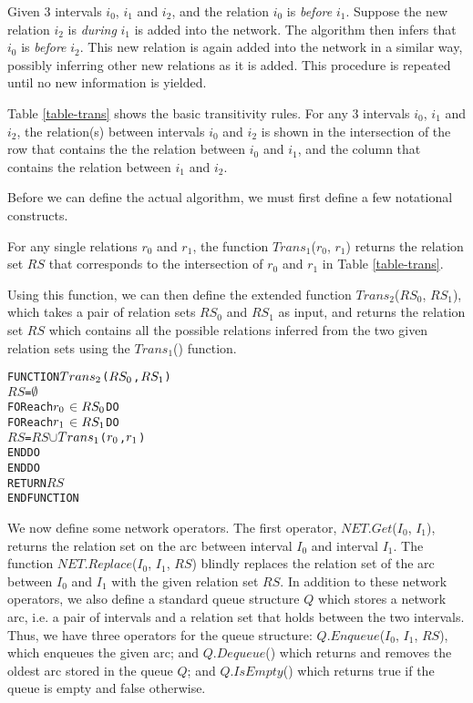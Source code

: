 \documentclass[11pt]{report}
\newenvironment{vverbatim}
{
  \begin{alltt}
}
{
  \vspace{-\baselineskip}
  \end{alltt}
}
\begin{document}
          Given 3 intervals $i_0$, $i_1$ and $i_2$, and the relation $i_0$ is
          {\em before} $i_1$. Suppose the new relation $i_2$ is {\em during} $i_1$ is
          added into the network. The algorithm then infers that $i_0$ is {\em before}
          $i_2$. This new relation is again added into the network in a similar way,
          possibly inferring other new relations as it is added. This procedure is
          repeated until no new information is yielded.

          Table \ref{table-trans} shows the basic transitivity rules. For any 3
          intervals $i_0$, $i_1$ and $i_2$, the relation(s) between intervals
          $i_0$ and $i_2$ is shown in the intersection of the row that contains the
          the relation between $i_0$ and $i_1$, and the column that contains the
          relation between $i_1$ and $i_2$.

          Before we can define the actual algorithm, we must first define a few
          notational constructs.

          For any single relations $r_0$ and $r_1$, the function $Trans_1$($r_0$, $r_1$)
          returns the relation set $RS$ that corresponds to the intersection of $r_0$
          and $r_1$ in Table \ref{table-trans}.

          Using this function, we can then define the extended function
          $Trans_2$($RS_0$, $RS_1$), which takes a pair of relation sets $RS_0$ and
          $RS_1$ as input, and returns the relation set $RS$ which contains all the
          possible relations inferred from the two given relation sets using the
          $Trans_1$() function.

          \begin{vverbatim}
  FUNCTION \(Trans\sb{2}\)(\(RS\sb{0}\), \(RS\sb{1}\))
    \(RS\) = \(\emptyset\)
    FOR each \(r\sb{0}\) \(\in\) \(RS\sb{0}\) DO
      FOR each \(r\sb{1}\) \(\in\) \(RS\sb{1}\) DO
        \(RS\) = \(RS\) \(\cup\) \(Trans\sb{1}\)(\(r\sb{0}\), \(r\sb{1}\))
      ENDDO
    ENDDO
    RETURN \(RS\)
  ENDFUNCTION
          \end{vverbatim}

          We now define some network operators. The first operator,
          $NET.Get$($I_0$, $I_1$), returns the relation set on the arc between
          interval $I_0$ and interval $I_1$. The function $NET.Replace$($I_0$, $I_1$,
          $RS$) blindly replaces the relation set of the arc between $I_0$ and $I_1$
          with the given relation set $RS$. In addition to these network operators,
          we also define a standard queue structure $Q$ which stores a network arc,
          i.e. a pair of intervals and a relation set that holds between the two
          intervals. Thus, we have three operators for the queue structure:
          $Q.Enqueue$($I_0$, $I_1$, $RS$), which enqueues the given arc; and
          $Q.Dequeue$() which returns and removes the oldest arc stored in the queue
          $Q$; and $Q.IsEmpty$() which returns true if the queue is empty and false
          otherwise.
\end{document}
